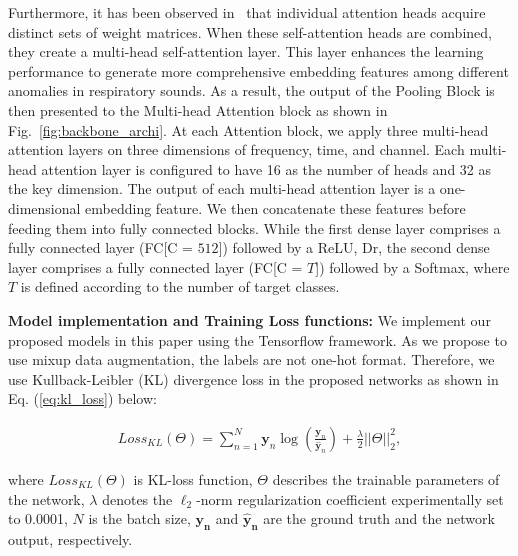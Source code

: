 \documentclass[conference]{IEEEtran}
\begin{document}
Furthermore, it has been observed in~\cite{vaswani2017attention} that individual attention heads acquire distinct sets of weight matrices. When these self-attention heads are combined, they create a multi-head self-attention layer. This layer enhances the learning performance to generate more comprehensive embedding features among different anomalies in respiratory sounds. As a result, the output of the Pooling Block is then presented to the Multi-head Attention block as shown in Fig.~\ref{fig:backbone_archi}.  At each Attention block, we apply three multi-head attention layers on three dimensions of frequency, time, and channel. Each multi-head attention layer is configured to have 16 as the number of heads and 32 as the key dimension.
The output of each multi-head attention layer is a one-dimensional embedding feature. We then concatenate these features before feeding them into fully connected blocks. While the first dense layer comprises a fully connected layer (FC[C = $512$]) followed by a ReLU, Dr, the second dense layer comprises a fully connected layer (FC[C = $T$]) followed by a Softmax, where $T$ is defined according to the number of target classes.

\textbf{Model implementation and Training Loss functions:} We implement our proposed models in this paper using the Tensorflow framework. As we propose to use mixup data augmentation, the labels are not one-hot format.
Therefore, we use Kullback-Leibler (KL) divergence loss in the proposed networks as shown in Eq. (\ref{eq:kl_loss}) below:

\begin{align}
\label{eq:kl_loss}
Loss_{KL}(\Theta) = \sum_{n=1}^{N}\mathbf{y}_{n}\log(\frac{\mathbf{y}_{n}}{\mathbf{\hat{y}}_{n}})  +  \frac{\lambda}{2}||\Theta||_{2}^{2},
\end{align}

where \(Loss_{KL}(\Theta)\) is KL-loss function, $\Theta$ describes the trainable parameters of the network, $\lambda$ denotes the $\ell_2$-norm regularization coefficient experimentally set to 0.0001, \(N\) is the batch size, $\mathbf{y_{n}}$ and $\mathbf{\hat{y}_{n}}$  are the ground truth and the network output, respectively.


\end{document}
